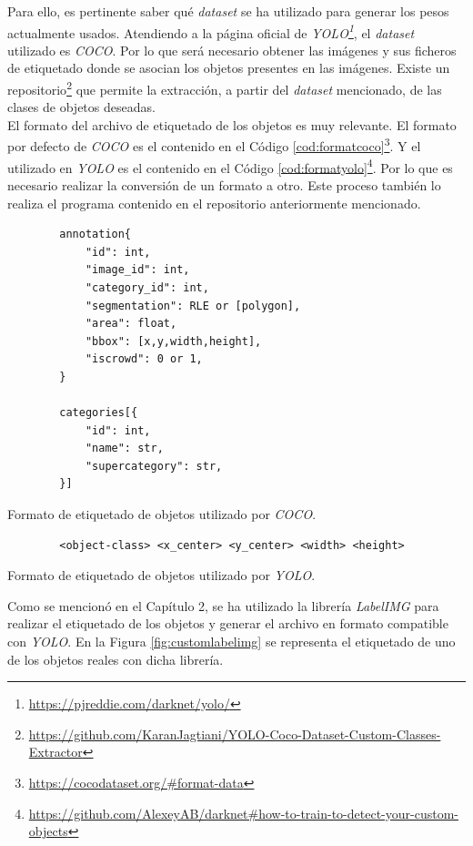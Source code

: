 Para ello, es pertinente saber qué \textit{dataset} se ha utilizado para generar los pesos actualmente usados. Atendiendo a la página oficial de \textit{YOLO\footnote{\url{https://pjreddie.com/darknet/yolo/}}}, el \textit{dataset} utilizado es \textit{COCO}. Por lo que será necesario obtener las imágenes y sus ficheros de etiquetado donde se asocian los objetos presentes en las imágenes. Existe un repositorio\footnote{\url{https://github.com/KaranJagtiani/YOLO-Coco-Dataset-Custom-Classes-Extractor}} que permite la extracción, a partir del \textit{dataset} mencionado, de las clases de objetos deseadas.\\

El formato del archivo de etiquetado de los objetos es muy relevante. El formato por defecto de \textit{COCO} es el contenido en el Código \ref{cod:formatcoco}\footnote{\url{https://cocodataset.org/\#format-data}}. Y el utilizado en \textit{YOLO} es el contenido en el Código \ref{cod:formatyolo}\footnote{\url{https://github.com/AlexeyAB/darknet\#how-to-train-to-detect-your-custom-objects}}. Por lo que es necesario realizar la conversión de un formato a otro. Este proceso también lo realiza el programa contenido en el repositorio anteriormente mencionado.\\

\begin{code}[h]
	\begin{lstlisting}
		annotation{
			"id": int, 
			"image_id": int, 
			"category_id": int, 
			"segmentation": RLE or [polygon], 
			"area": float, 
			"bbox": [x,y,width,height], 
			"iscrowd": 0 or 1,
		}

		categories[{
			"id": int, 
			"name": str, 
			"supercategory": str,
		}]
	\end{lstlisting}
	\caption[Formato de etiquetado de objetos utilizado por \textit{COCO}.]{Formato de etiquetado de objetos utilizado por \textit{COCO}.}
	\label{cod:formatcoco}
\end{code}

\begin{code}[h]
	\begin{lstlisting}
		<object-class> <x_center> <y_center> <width> <height>
	\end{lstlisting}
	\caption[Formato de etiquetado de objetos utilizado por \textit{YOLO}.]{Formato de etiquetado de objetos utilizado por \textit{YOLO}.}
	\label{cod:formatyolo}
\end{code}

Como se mencionó en el Capítulo 2, se ha utilizado la librería \textit{LabelIMG} para realizar el etiquetado de los objetos y generar el archivo en formato compatible con \textit{YOLO}. En la Figura \ref{fig:customlabelimg} se representa el etiquetado de uno de los objetos reales con dicha librería.\\

